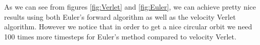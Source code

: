 \documentclass[a4paper, fontsize=11pt]{article}
\begin{document}
As we can see from figures \ref{fig:Verlet} and \ref{fig:Euler}, we can achieve pretty nice results using both Euler's forward algorithm as well as the velocity Verlet algorithm. However we notice that in order to get a nice circular orbit we need 100 times more timesteps for Euler's method compared to velocity Verlet.









\end{document}
